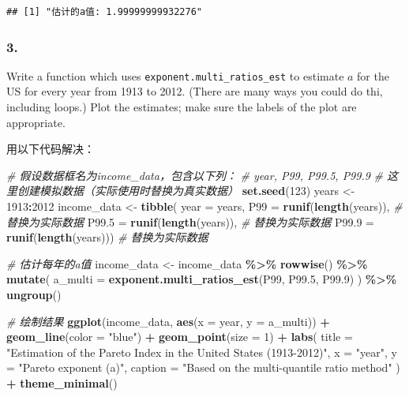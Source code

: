 \documentclass[
]{article}
\newenvironment{Shaded}{\begin{snugshade}}{\end{snugshade}}
\newcommand{\AttributeTok}[1]{\textcolor[rgb]{0.13,0.29,0.53}{#1}}
\newcommand{\CommentTok}[1]{\textcolor[rgb]{0.56,0.35,0.01}{\textit{#1}}}
\newcommand{\DecValTok}[1]{\textcolor[rgb]{0.00,0.00,0.81}{#1}}
\newcommand{\FloatTok}[1]{\textcolor[rgb]{0.00,0.00,0.81}{#1}}
\newcommand{\FunctionTok}[1]{\textcolor[rgb]{0.13,0.29,0.53}{\textbf{#1}}}
\newcommand{\NormalTok}[1]{#1}
\newcommand{\OtherTok}[1]{\textcolor[rgb]{0.56,0.35,0.01}{#1}}
\newcommand{\SpecialCharTok}[1]{\textcolor[rgb]{0.81,0.36,0.00}{\textbf{#1}}}
\newcommand{\StringTok}[1]{\textcolor[rgb]{0.31,0.60,0.02}{#1}}
\begin{document}
\begin{verbatim}
## [1] "估计的a值: 1.99999999932276"
\end{verbatim}

\subsubsection{3.}\label{section-2}

Write a function which uses \texttt{exponent.multi\_ratios\_est} to
estimate \(a\) for the US for every year from 1913 to 2012. (There are
many ways you could do thi, including loops.) Plot the estimates; make
sure the labels of the plot are appropriate.

用以下代码解决：

\begin{Shaded}
\begin{Highlighting}[]
\CommentTok{\# 假设数据框名为income\_data，包含以下列：}
\CommentTok{\# year, P99, P99.5, P99.9}
\CommentTok{\# 这里创建模拟数据（实际使用时替换为真实数据）}
\FunctionTok{set.seed}\NormalTok{(}\DecValTok{123}\NormalTok{)}
\NormalTok{years }\OtherTok{\textless{}{-}} \DecValTok{1913}\SpecialCharTok{:}\DecValTok{2012}
\NormalTok{income\_data }\OtherTok{\textless{}{-}} \FunctionTok{tibble}\NormalTok{(}
  \AttributeTok{year =}\NormalTok{ years,}
  \AttributeTok{P99 =} \FunctionTok{runif}\NormalTok{(}\FunctionTok{length}\NormalTok{(years)),     }\CommentTok{\# 替换为实际数据}
  \AttributeTok{P99.5 =} \FunctionTok{runif}\NormalTok{(}\FunctionTok{length}\NormalTok{(years)),  }\CommentTok{\# 替换为实际数据}
  \AttributeTok{P99.9 =} \FunctionTok{runif}\NormalTok{(}\FunctionTok{length}\NormalTok{(years)))   }\CommentTok{\# 替换为实际数据}

\CommentTok{\# 估计每年的a值}
\NormalTok{income\_data }\OtherTok{\textless{}{-}}\NormalTok{ income\_data }\SpecialCharTok{\%\textgreater{}\%}
  \FunctionTok{rowwise}\NormalTok{() }\SpecialCharTok{\%\textgreater{}\%}
  \FunctionTok{mutate}\NormalTok{(}
    \AttributeTok{a\_multi =} \FunctionTok{exponent.multi\_ratios\_est}\NormalTok{(P99, P99}\FloatTok{.5}\NormalTok{, P99}\FloatTok{.9}\NormalTok{)}
\NormalTok{  ) }\SpecialCharTok{\%\textgreater{}\%}
  \FunctionTok{ungroup}\NormalTok{()}

\CommentTok{\# 绘制结果}
\FunctionTok{ggplot}\NormalTok{(income\_data, }\FunctionTok{aes}\NormalTok{(}\AttributeTok{x =}\NormalTok{ year, }\AttributeTok{y =}\NormalTok{ a\_multi)) }\SpecialCharTok{+}
  \FunctionTok{geom\_line}\NormalTok{(}\AttributeTok{color =} \StringTok{"blue"}\NormalTok{) }\SpecialCharTok{+}
  \FunctionTok{geom\_point}\NormalTok{(}\AttributeTok{size =} \DecValTok{1}\NormalTok{) }\SpecialCharTok{+}
  \FunctionTok{labs}\NormalTok{(}
    \AttributeTok{title =} \StringTok{"Estimation of the Pareto Index in the United States (1913{-}2012)"}\NormalTok{,}
    \AttributeTok{x =} \StringTok{"year"}\NormalTok{,}
    \AttributeTok{y =} \StringTok{"Pareto exponent (a)"}\NormalTok{,}
    \AttributeTok{caption =} \StringTok{"Based on the multi{-}quantile ratio method"}
\NormalTok{  ) }\SpecialCharTok{+}
  \FunctionTok{theme\_minimal}\NormalTok{()}
\end{Highlighting}
\end{Shaded}
\end{document}
